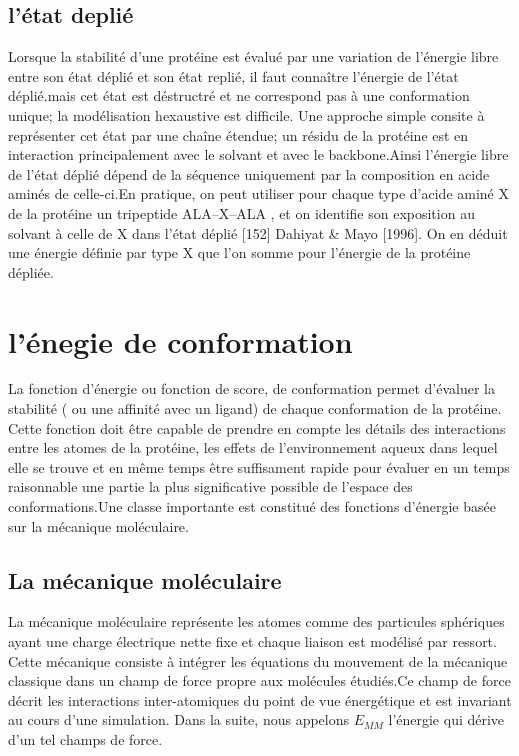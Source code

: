 \subsection{l'état deplié }
Lorsque la stabilité d'une protéine est évalué par une variation de l'énergie libre entre son état déplié et son état replié, il faut connaître l'énergie de l'état déplié.mais cet état est déstructré et ne correspond pas à une conformation unique; la modélisation hexaustive est difficile. Une approche simple consite à représenter cet état par une chaîne étendue; un résidu de la protéine est en interaction principalement avec le solvant et avec le backbone.Ainsi l'énergie libre de l'état déplié dépend de la séquence uniquement par la composition en acide aminés de celle-ci.En pratique, on peut utiliser pour chaque type d'acide aminé X de la protéine  un tripeptide ALA--X--ALA , et on identifie son exposition au solvant à celle de X dans l'état déplié [152] Dahiyat & Mayo [1996]. On en déduit une énergie définie par type X que l'on somme pour l'énergie de la protéine dépliée. 

\section{l'énegie de conformation}

La fonction d'énergie ou fonction de score,  de conformation permet d'évaluer la stabilité ( ou une affinité avec un ligand) de chaque conformation de la protéine. Cette fonction doit être capable de prendre en compte les détails des interactions entre les atomes de la protéine, les effets de l'environnement aqueux  dans lequel elle se trouve et en même temps être suffisament rapide pour évaluer en un temps raisonnable une partie la plus significative possible de l'espace des conformations.Une classe importante est constitué des fonctions d'énergie basée sur la mécanique moléculaire.

\subsection{La mécanique moléculaire}
La mécanique moléculaire représente les atomes comme des particules sphériques ayant une charge électrique nette fixe et chaque liaison est modélisé par ressort.
Cette mécanique consiste à intégrer les équations du mouvement de la mécanique classique dans un champ de force propre aux molécules étudiés.Ce champ de force décrit les interactions inter-atomiques du point de vue énergétique et est invariant au cours d'une simulation.
Dans la suite, nous appelons $E_{MM}$ l'énergie qui dérive d'un tel champs de force.

